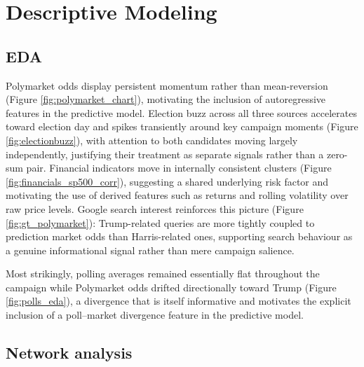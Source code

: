 \section{Descriptive Modeling}

\subsection{EDA}

Polymarket odds display persistent momentum rather than mean-reversion (Figure \ref{fig:polymarket_chart}), motivating the inclusion of autoregressive features in the predictive model. Election buzz across all three sources accelerates toward election day and spikes transiently around key campaign moments (Figure \ref{fig:electionbuzz}), with attention to both candidates moving largely independently, justifying their treatment as separate signals rather than a zero-sum pair. Financial indicators move in internally consistent clusters (Figure \ref{fig:financials_sp500_corr}), suggesting a shared underlying risk factor and motivating the use of derived features such as returns and rolling volatility over raw price levels. Google search interest reinforces this picture (Figure \ref{fig:gt_polymarket}): Trump-related queries are more tightly coupled to prediction market odds than Harris-related ones, supporting search behaviour as a genuine informational signal rather than mere campaign salience.

Most strikingly, polling averages remained essentially flat throughout the campaign while Polymarket odds drifted directionally toward Trump (Figure \ref{fig:polls_eda}), a divergence that is itself informative and motivates the explicit inclusion of a poll--market divergence feature in the predictive model.

\subsection{Network analysis}

